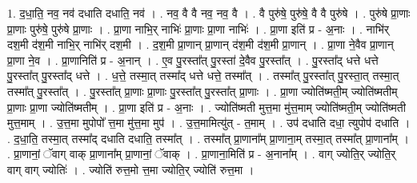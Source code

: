 \documentclass[17pt]{extarticle}
\begin{document}
1. द॒धा॒ति॒ नव॒ नव॑ दधाति दधाति॒ नव॑ । . नव॒ वै वै नव॒ नव॒ वै । . वै पुरु॑षे॒ पुरु॑षे॒ वै वै पुरु॑षे । . पुरु॑षे प्रा॒णाः प्रा॒णाः पुरु॑षे॒ पुरु॑षे प्रा॒णाः । . प्रा॒णा नाभि॒र् नाभिः॑ प्रा॒णाः प्रा॒णा नाभिः॑ । . प्रा॒णा इति॑ प्र - अ॒नाः । . नाभि॑र् दश॒मी द॑श॒मी नाभि॒र् नाभि॑र् दश॒मी । . द॒श॒मी प्रा॒णान् प्रा॒णान् द॑श॒मी द॑श॒मी प्रा॒णान् । . प्रा॒णा ने॒वैव प्रा॒णान् प्रा॒णा ने॒व । . प्रा॒णानिति॑ प्र - अ॒नान् । . ए॒व पु॒रस्ता᳚त् पु॒रस्ता॑ दे॒वैव पु॒रस्ता᳚त् । . पु॒रस्ता᳚द् धत्ते धत्ते पु॒रस्ता᳚त् पु॒रस्ता᳚द् धत्ते । . ध॒त्ते॒ तस्मा॒त् तस्मा᳚द् धत्ते धत्ते॒ तस्मा᳚त् । . तस्मा᳚त् पु॒रस्ता᳚त् पु॒रस्ता॒त् तस्मा॒त् तस्मा᳚त् पु॒रस्ता᳚त् । . पु॒रस्ता᳚त् प्रा॒णाः प्रा॒णाः पु॒रस्ता᳚त् पु॒रस्ता᳚त् प्रा॒णाः । . प्रा॒णा ज्योति॑ष्मती॒म् ज्योति॑ष्मतीम् प्रा॒णाः प्रा॒णा ज्योति॑ष्मतीम् । . प्रा॒णा इति॑ प्र - अ॒नाः । . ज्योति॑ष्मती मुत्त॒मा मु॑त्त॒माम् ज्योति॑ष्मती॒म् ज्योति॑ष्मती मुत्त॒माम् । . उ॒त्त॒मा मुपोपो᳚ त्त॒मा मु॑त्त॒मा मुप॑ । . उ॒त्त॒मामित्यु॑त् - त॒माम् । . उप॑ दधाति दधा॒ त्युपोप॑ दधाति । . द॒धा॒ति॒ तस्मा॒त् तस्मा᳚द् दधाति दधाति॒ तस्मा᳚त् । . तस्मा᳚त् प्रा॒णाना᳚म् प्रा॒णाना॒म् तस्मा॒त् तस्मा᳚त् प्रा॒णाना᳚म् । . प्रा॒णानां॒ ॅवाग् वाक् प्रा॒णाना᳚म् प्रा॒णानां॒ ॅवाक् । . प्रा॒णाना॒मिति॑ प्र - अ॒नाना᳚म् । . वाग् ज्योति॒र् ज्योति॒र् वाग् वाग् ज्योतिः॑ । . ज्योति॑ रुत्त॒मो त्त॒मा ज्योति॒र् ज्योति॑ रुत्त॒मा । \newline
\end{document}
